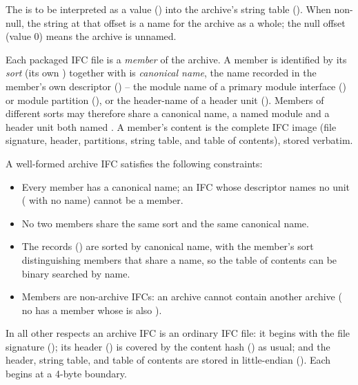The  is to be interpreted  as a  value () into the
archive's string table ().  When non-null, the string at that offset is a name for the archive
as a whole; the null offset (value $0$) means the archive is unnamed.

Each packaged IFC file is a \emph{member} of the archive.  A member is identified by its
\emph{sort} (its own ) together with is \emph{canonical name}, the name
recorded in the member's own  descriptor () -- \eg{} the module name of a primary
module interface () or module partition (), or the
header-name of a header unit ().  Members of different sorts may therefore share
a canonical name, \eg{} a named module and a header unit both named .  A member's content
is the complete IFC image (file signature, header, partitions, string table, and table of contents), stored verbatim.

A well-formed archive IFC satisfies the following constraints:
\begin{itemize}
\item Every member has a canonical name; an IFC whose  descriptor names no unit 
	(\eg{}  with no name) cannot be a member.
\item  No two members share the same sort and the same canonical name.
\item The  records () are sorted by canonical name,
	with the member's sort distinguishing members that share a name, so the table of contents can be 
	binary searched by name.
\item Members are non-archive IFCs: an archive cannot contain another archive (\ie{} no  has a member whose
	 is also ).
\end{itemize}

In all other respects an archive IFC is an ordinary IFC file: it begins with the file signature ();
its header () is covered by the content hash () as usual; and the
header, string table, and table of contents are stored in little-endian ().  
Each begins at a 4-byte boundary.
